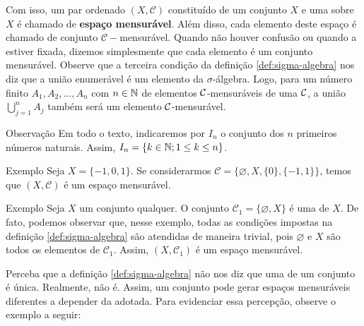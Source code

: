 Com isso, um par ordenado $(X, \mathcal{C})$  constituído de um conjunto $X$ e uma \sigal sobre $X$ é chamado de  \textbf{espaço mensurável}.
Além disso, cada elemento deste espaço é chamado de conjunto $\mathcal{C}-$mensurável.
Quando não houver confusão ou quando a \sigal estiver fixada, dizemos simplesmente que cada elemento é um conjunto mensurável. 
Observe que a terceira condição da definição \ref{def:sigma-algebra} nos diz que a união enumerável é um elemento da $\sigma$-álgebra.
Logo, para um número finito $A_1, A_2, ..., A_n$ com $n \in \operatorname{\mathbb{N}}$ de elementos $\operatorname{\mathcal{C}}$-mensuráveis de uma \sigal $\operatorname{\mathcal{C}}$, a união $\displaystyle \bigcup_{j = 1}^n A_j$ também será um elemento $\operatorname{\mathcal{C}}$-mensurável.
\begin{resultado}{Observação}
	Em todo o texto, indicaremos por $I_n$ o conjunto dos $n$ primeiros números naturais. 
	Assim, $I_n = \{k \in \operatorname{\mathbb{N}}; 1 \leq k \leq n\}$.
\end{resultado}


\begin{resultado}{Exemplo}
    Seja $X = \{-1,0,1\}$. Se considerarmos $\mathcal{C} = \{\varnothing, X, \{0\}, \{-1,1\}\}$, temos que $(X, \mathcal{C})$ é um espaço mensurável.
\end{resultado}

\begin{resultado}{Exemplo}
	\label{ex:sigma-trivial}
	Seja $X$ um conjunto qualquer.
	O conjunto $\mathcal{C}_1 = \{\varnothing, X\}$ é uma \sigal de $X$.
	De fato, podemos observar que, nesse exemplo, todas as condições impostas na definição \ref{def:sigma-algebra} são atendidas de maneira trivial, pois 
	$\varnothing$ e $X$ são todos os elementos de $\mathcal{C}_1$. 
	Assim,  $(X, \mathcal{C}_1)$ é um espaço mensurável.
	
\end{resultado}
%
\vspace{-0.2cm}Perceba que a definição \ref{def:sigma-algebra} não nos diz que uma \sigal de um conjunto é única.
Realmente, não é. 
Assim, um conjunto pode gerar espaços mensuráveis diferentes a depender da \sigal adotada.
Para evidenciar essa percepção, observe o exemplo a seguir:


